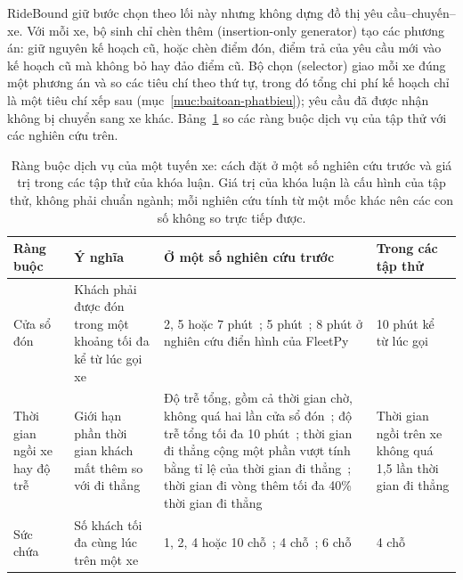 RideBound giữ bước chọn theo lối này nhưng không dựng đồ thị yêu cầu--chuyến--xe. Với mỗi xe, bộ sinh chỉ chèn thêm
(insertion-only generator) tạo các phương án: giữ nguyên kế hoạch cũ, hoặc chèn điểm đón, điểm trả của yêu cầu mới
vào kế hoạch cũ mà không bỏ hay đảo điểm cũ. Bộ chọn (selector) giao mỗi xe đúng một phương án và so các tiêu chí
theo thứ tự, trong đó tổng chi phí kế hoạch chỉ là một tiêu chí xếp sau (mục~\ref{muc:baitoan-phatbieu}); yêu cầu đã
được nhận không bị chuyển sang xe khác. Bảng~\ref{bang:c2-dichvu} so các ràng buộc dịch vụ của tập thử với các nghiên
cứu trên.

\begin{table}[htbp]
\centering
\caption{Ràng buộc dịch vụ của một tuyến xe: cách đặt ở một số nghiên cứu trước và giá trị trong các tập thử của
khóa luận. Giá trị của khóa luận là cấu hình của tập thử, không phải chuẩn ngành; mỗi nghiên cứu tính từ một mốc
khác nên các con số không so trực tiếp được.}
\label{bang:c2-dichvu}
\small
\begin{tabular}{@{}p{2.4cm}p{3.4cm}p{5.7cm}p{3.1cm}@{}}
\toprule
\textbf{Ràng buộc} & \textbf{Ý nghĩa} & \textbf{Ở một số nghiên cứu trước} & \textbf{Trong các tập thử}\\
\midrule
Cửa sổ đón & Khách phải được đón trong một khoảng tối đa kể từ lúc gọi xe & 2, 5 hoặc 7
phút~\cite{alonsomora2017}; 5 phút~\cite{fielbaum2020,elmi2026}; 8 phút ở nghiên cứu điển hình của
FleetPy~\cite{engelhardt2026} & 10 phút kể từ lúc gọi\\
Thời gian ngồi xe hay độ trễ & Giới hạn phần thời gian khách mất thêm so với đi thẳng & Độ trễ tổng, gồm cả thời gian
chờ, không quá hai lần cửa sổ đón~\cite{alonsomora2017}; độ trễ tổng tối đa 10 phút~\cite{fielbaum2020,elmi2026};
thời gian đi thẳng cộng một phần vượt tính bằng tỉ lệ của thời gian đi thẳng~\cite{molenbruch2017}; thời gian đi vòng thêm tối đa
40\% thời gian đi thẳng~\cite{engelhardt2026} & Thời gian ngồi trên xe không quá 1,5 lần thời gian đi thẳng\\
Sức chứa & Số khách tối đa cùng lúc trên một xe & 1, 2, 4 hoặc 10 chỗ~\cite{alonsomora2017}; 4
chỗ~\cite{engelhardt2026}; 6 chỗ~\cite{schulz2026} & 4 chỗ\\
\bottomrule
\end{tabular}
\end{table}

